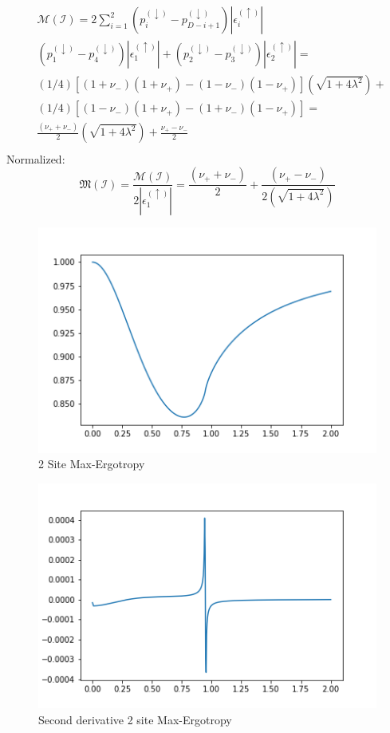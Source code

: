 \documentclass[10pt,a4paper]{article}
\begin{document}
\begin{equation}
	\begin{aligned}
		&
		\mathcal{M}(\mathcal{I})=2 \sum_{i=1}^ {2}\left(p_{i}^{(\downarrow)}-p_{D-i+1}^{(\downarrow)}\right)\left|\epsilon_{i}^{(\uparrow)}\right|	\\
		& \left(p_{1}^{(\downarrow)}-p_{4}^{(\downarrow)}\right)\left|\epsilon_{1}^{(\uparrow)}\right|+\left(p_{2}^{(\downarrow)}-p_{3}^{(\downarrow)}\right)\left|\epsilon_{2}^{(\uparrow)}\right|=\\
		& (1/4)\left[(1+\nu_-)(1+\nu_+)-(1-\nu_-)(1-\nu_+)\right] \left(\sqrt{1+4 \lambda ^2}\right) + \\
		&(1/4)\left[(1-\nu_-)(1+\nu_+)-(1+\nu_-)(1-\nu_+)\right] = \\
		&\frac{(\nu_+ + \nu_-)}{2}\left(\sqrt{1+4 \lambda ^2}\right)+\frac{\nu_+-\nu_-}{2} \\
	\end{aligned}
\end{equation}
Normalized:
\begin{equation}
	\mathfrak{M}(\mathcal{I}) = \frac{\mathcal{M}(\mathcal{I})}{2\left|\epsilon_{1}^{(\uparrow)}\right|} =\frac{(\nu_+ + \nu_-)}{2}+\frac{(\nu_+-\nu_-)} {2\left(\sqrt{1+4 \lambda ^2}\right)}
\end{equation}
\begin{figure}[h]
	\centering
	\includegraphics[width=0.7\linewidth]{2_site_ergo_theo}
	\caption{2 Site Max-Ergotropy}
	\label{fig:2siteergotheo}
\end{figure}
\begin{figure}[h]
	\centering
	\includegraphics[width=0.7\linewidth]{2_site_ergo_theo_secdev}
	\caption{Second derivative 2 site Max-Ergotropy}
	\label{fig:2siteergotheosecdev}
\end{figure}
\newpage
\end{document}

